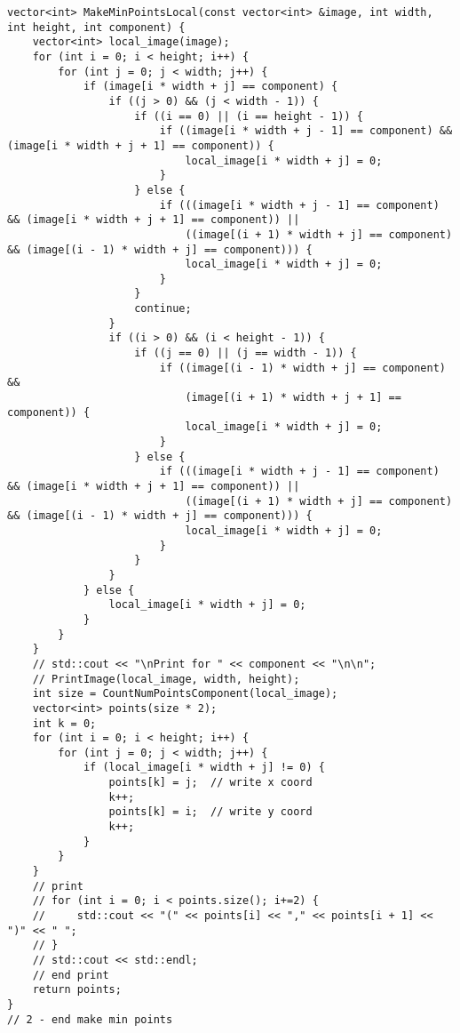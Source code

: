 \documentclass{report}
\begin{document}
\begin{lstlisting}
vector<int> MakeMinPointsLocal(const vector<int> &image, int width, int height, int component) {
    vector<int> local_image(image);
    for (int i = 0; i < height; i++) {
        for (int j = 0; j < width; j++) {
            if (image[i * width + j] == component) {
                if ((j > 0) && (j < width - 1)) {
                    if ((i == 0) || (i == height - 1)) {
                        if ((image[i * width + j - 1] == component) && (image[i * width + j + 1] == component)) {
                            local_image[i * width + j] = 0;
                        }
                    } else {
                        if (((image[i * width + j - 1] == component) && (image[i * width + j + 1] == component)) ||
                            ((image[(i + 1) * width + j] == component) && (image[(i - 1) * width + j] == component))) {
                            local_image[i * width + j] = 0;
                        }
                    }
                    continue;
                }
                if ((i > 0) && (i < height - 1)) {
                    if ((j == 0) || (j == width - 1)) {
                        if ((image[(i - 1) * width + j] == component) &&
                            (image[(i + 1) * width + j + 1] == component)) {
                            local_image[i * width + j] = 0;
                        }
                    } else {
                        if (((image[i * width + j - 1] == component) && (image[i * width + j + 1] == component)) ||
                            ((image[(i + 1) * width + j] == component) && (image[(i - 1) * width + j] == component))) {
                            local_image[i * width + j] = 0;
                        }
                    }
                }
            } else {
                local_image[i * width + j] = 0;
            }
        }
    }
    // std::cout << "\nPrint for " << component << "\n\n";
    // PrintImage(local_image, width, height);
    int size = CountNumPointsComponent(local_image);
    vector<int> points(size * 2);
    int k = 0;
    for (int i = 0; i < height; i++) {
        for (int j = 0; j < width; j++) {
            if (local_image[i * width + j] != 0) {
                points[k] = j;  // write x coord
                k++;
                points[k] = i;  // write y coord
                k++;
            }
        }
    }
    // print
    // for (int i = 0; i < points.size(); i+=2) {
    //     std::cout << "(" << points[i] << "," << points[i + 1] << ")" << " ";
    // }
    // std::cout << std::endl;
    // end print
    return points;
}
// 2 - end make min points


\end{lstlisting}
\end{document}
